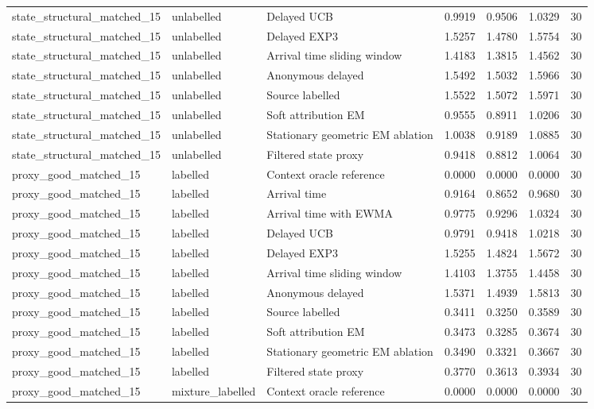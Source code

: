 \begin{tabular}{llllllr}
state\_structural\_matched\_15 & unlabelled & Delayed UCB & 0.9919 & 0.9506 & 1.0329 & 30 \\
state\_structural\_matched\_15 & unlabelled & Delayed EXP3 & 1.5257 & 1.4780 & 1.5754 & 30 \\
state\_structural\_matched\_15 & unlabelled & Arrival time sliding window & 1.4183 & 1.3815 & 1.4562 & 30 \\
state\_structural\_matched\_15 & unlabelled & Anonymous delayed & 1.5492 & 1.5032 & 1.5966 & 30 \\
state\_structural\_matched\_15 & unlabelled & Source labelled & 1.5522 & 1.5072 & 1.5971 & 30 \\
state\_structural\_matched\_15 & unlabelled & Soft attribution EM & 0.9555 & 0.8911 & 1.0206 & 30 \\
state\_structural\_matched\_15 & unlabelled & Stationary geometric EM ablation & 1.0038 & 0.9189 & 1.0885 & 30 \\
state\_structural\_matched\_15 & unlabelled & Filtered state proxy & 0.9418 & 0.8812 & 1.0064 & 30 \\
proxy\_good\_matched\_15 & labelled & Context oracle reference & 0.0000 & 0.0000 & 0.0000 & 30 \\
proxy\_good\_matched\_15 & labelled & Arrival time & 0.9164 & 0.8652 & 0.9680 & 30 \\
proxy\_good\_matched\_15 & labelled & Arrival time with EWMA & 0.9775 & 0.9296 & 1.0324 & 30 \\
proxy\_good\_matched\_15 & labelled & Delayed UCB & 0.9791 & 0.9418 & 1.0218 & 30 \\
proxy\_good\_matched\_15 & labelled & Delayed EXP3 & 1.5255 & 1.4824 & 1.5672 & 30 \\
proxy\_good\_matched\_15 & labelled & Arrival time sliding window & 1.4103 & 1.3755 & 1.4458 & 30 \\
proxy\_good\_matched\_15 & labelled & Anonymous delayed & 1.5371 & 1.4939 & 1.5813 & 30 \\
proxy\_good\_matched\_15 & labelled & Source labelled & 0.3411 & 0.3250 & 0.3589 & 30 \\
proxy\_good\_matched\_15 & labelled & Soft attribution EM & 0.3473 & 0.3285 & 0.3674 & 30 \\
proxy\_good\_matched\_15 & labelled & Stationary geometric EM ablation & 0.3490 & 0.3321 & 0.3667 & 30 \\
proxy\_good\_matched\_15 & labelled & Filtered state proxy & 0.3770 & 0.3613 & 0.3934 & 30 \\
proxy\_good\_matched\_15 & mixture\_labelled & Context oracle reference & 0.0000 & 0.0000 & 0.0000 & 30 \\

\end{tabular}
